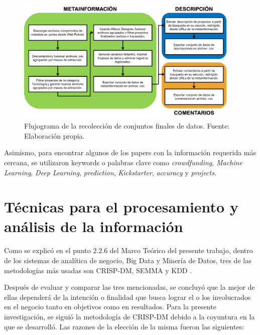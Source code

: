 \begin{figure}[h]
	\begin{center}
		\includegraphics[width=0.95\textwidth]{3/figures/data_recolection_flux.png}
		\caption{Flujograma de la recolección de conjuntos finales de datos. Fuente: Elaboración propia.}
		\label{3:fig4}
	\end{center}
\end{figure}

Asimismo, para encontrar algunos de los papers con la información requerida más cercana, se utilizaron keywords o palabras clave como \textit{crowdfunding}, \textit{Machine Learning}, \textit{Deep Learning}, \textit{prediction}, \textit{Kickstarter}, \textit{accuracy} y \textit{projects}.

\section{Técnicas para el procesamiento y análisis de la información}
Como se explicó en el punto 2.2.6 del Marco Teórico del presente trabajo, dentro de los sistemas de analítica de negocio, Big Data y Minería de Datos, tres de las metodologías más usadas son CRISP-DM, SEMMA y KDD \parencite{tec_braulio2015metodologiasdm}.

Después de evaluar y comparar las tres mencionadas, se concluyó que la mejor de ellas dependerá de la intención o finalidad que busca lograr el o los involucrados en el negocio tanto en objetivos como en resultados. Para la presente investigación, se siguió la metodología de CRISP-DM debido a la coyuntura en la que se desarrolló. Las razones de la elección de la misma fueron las siguientes:

